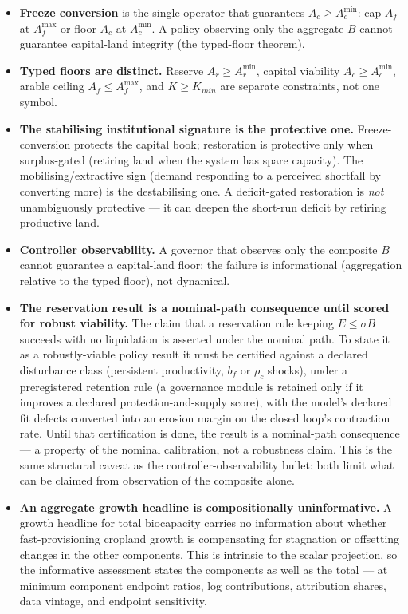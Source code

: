 \documentclass[11pt]{article}
\begin{document}
\begin{itemize}
\item \textbf{Freeze conversion} is the single operator that guarantees $A_c\ge A_c^{\min}$: cap $A_f$ at $A_f^{\max}$ or floor $A_c$ at $A_c^{\min}$. A policy observing only the aggregate $B$ cannot guarantee capital-land integrity (the typed-floor theorem).
\item \textbf{Typed floors are distinct.} Reserve $A_r\ge A_r^{\min}$, capital viability $A_c\ge A_c^{\min}$, arable ceiling $A_f\le A_f^{\max}$, and $K\ge K_{min}$ are separate constraints, not one symbol.
\item \textbf{The stabilising institutional signature is the protective one.} Freeze-conversion protects the capital book; restoration is protective only when surplus-gated (retiring land when the system has spare capacity). The mobilising/extractive sign (demand responding to a perceived shortfall by converting more) is the destabilising one. A deficit-gated restoration is \emph{not} unambiguously protective --- it can deepen the short-run deficit by retiring productive land.
\item \textbf{Controller observability.} A governor that observes only the composite $B$ cannot guarantee a capital-land floor; the failure is informational (aggregation relative to the typed floor), not dynamical.
\item \textbf{The reservation result is a nominal-path consequence until scored for robust viability.} The claim that a reservation rule keeping $E\le\sigma B$ succeeds with no liquidation is asserted under the nominal path. To state it as a robustly-viable policy result it must be certified against a declared disturbance class (persistent productivity, $b_f$ or $\rho_c$ shocks), under a preregistered retention rule (a governance module is retained only if it improves a declared protection-and-supply score), with the model's declared fit defects converted into an erosion margin on the closed loop's contraction rate. Until that certification is done, the result is a nominal-path consequence --- a property of the nominal calibration, not a robustness claim. This is the same structural caveat as the controller-observability bullet: both limit what can be claimed from observation of the composite alone.
\item \textbf{An aggregate growth headline is compositionally uninformative.} A growth headline for total biocapacity carries no information about whether fast-provisioning cropland growth is compensating for stagnation or offsetting changes in the other components. This is intrinsic to the scalar projection, so the informative assessment states the components as well as the total --- at minimum component endpoint ratios, log contributions, attribution shares, data vintage, and endpoint sensitivity.
\end{itemize}
\end{document}
